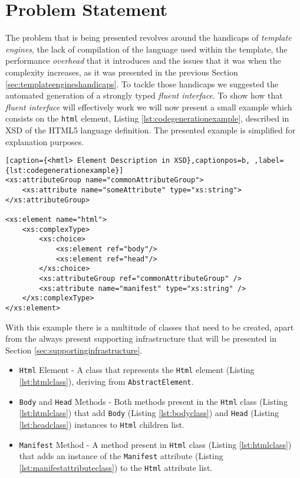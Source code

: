 \section{Problem Statement}
\label{sec:problemstatement}

The problem that is being presented revolves around the handicaps of \textit{template engines}, the lack of compilation of the language used within the template, the performance \textit{overhead} that it introduces and the issues that it was when the complexity increases, as it was presented in the previous Section \ref{sec:templateengineshandicaps}. To tackle those handicaps we suggested the automated generation of a strongly typed \textit{fluent interface}. To show how that \textit{fluent interface} will effectively work we will now present a small example which consists on the \texttt{html} element, Listing \ref{lst:codegenerationexample}, described in \ac{XSD} of the \ac{HTML}5 language definition. The presented example is simplified for explanation purposes.

\bigskip


\begin{minipage}{\linewidth}
\begin{lstlisting}[caption={<hmtl> Element Description in XSD},captionpos=b, ,label={lst:codegenerationexample}]
<xs:attributeGroup name="commonAttributeGroup">
    <xs:attribute name="someAttribute" type="xs:string">
</xs:attributeGroup>

<xs:element name="html">
    <xs:complexType>
        <xs:choice>
            <xs:element ref="body"/>
            <xs:element ref="head"/>
        </xs:choice>
        <xs:attributeGroup ref="commonAttributeGroup" />
        <xs:attribute name="manifest" type="xs:string" />
    </xs:complexType>
</xs:element>
\end{lstlisting}
\end{minipage}

\noindent
With this example there is a multitude of classes that need to be created, apart from the always present supporting infrastructure that will be presented in Section \ref{sec:supportinginfrastructure}. 

\begin{itemize}
	\item \texttt{Html} Element - A class that represents the \texttt{Html} element (Listing \ref{lst:htmlclass}), deriving from \texttt{AbstractElement}.
	\item \texttt{Body} and \texttt{Head} Methods - Both methods present in the \texttt{Html} class (Listing \ref{lst:htmlclass}) that add \texttt{Body} (Listing \ref{lst:bodyclass}) and \texttt{Head} (Listing \ref{lst:headclass}) instances to \texttt{Html} children list.
	\item \texttt{Manifest} Method - A method present in \texttt{Html} class (Listing \ref{lst:htmlclass}) that adds an instance of the \texttt{Manifest} attribute (Listing \ref{lst:manifestattributeclass}) to the \texttt{Html} attribute list.
\end{itemize}

